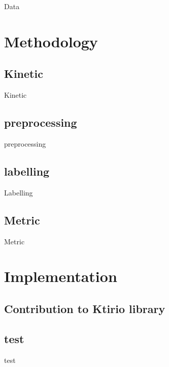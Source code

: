 \documentclass[10pt]{beamer}
\begin{document}
\begin{frame}{Data}
    
\end{frame}


\section{Methodology}
\subsection{Kinetic}
\begin{frame}{Kinetic}
    
\end{frame}

\subsection{preprocessing}
\begin{frame}{preprocessing}  
\end{frame}

\subsection{labelling}
\begin{frame}{Labelling}
\end{frame}

\subsection*{Metric}
\begin{frame}{Metric}
    
\end{frame}

\section{Implementation}
\subsection{Contribution to Ktirio library}
\begin{frame}
    
\end{frame}

\subsection{test}
\begin{frame}{test}
\end{frame}
\end{document}

